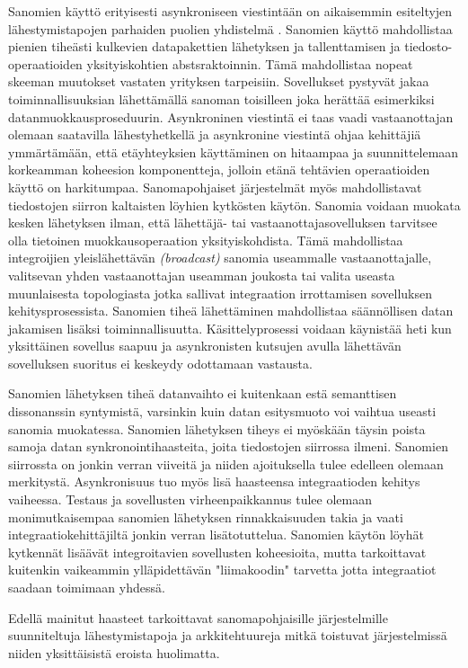 Sanomien käyttö erityisesti asynkroniseen viestintään on aikaisemmin esiteltyjen lähestymistapojen parhaiden puolien yhdistelmä \citep[sivu~73]{Hohpe2004}.
Sanomien käyttö mahdollistaa pienien tiheästi kulkevien datapakettien lähetyksen ja tallenttamisen ja tiedosto-operaatioiden yksityiskohtien abstsraktoinnin. Tämä mahdollistaa nopeat skeeman muutokset vastaten yrityksen tarpeisiin.
Sovellukset pystyvät jakaa toiminnallisuuksian lähettämällä sanoman toisilleen joka herättää esimerkiksi datanmuokkausproseduurin. Asynkroninen viestintä ei taas vaadi vastaanottajan olemaan saatavilla lähestyhetkellä ja asynkronine viestintä ohjaa kehittäjiä ymmärtämään, että etäyhteyksien käyttäminen on hitaampaa ja suunnittelemaan korkeamman koheesion komponentteja, jolloin etänä tehtävien operaatioiden käyttö on harkitumpaa.
Sanomapohjaiset järjestelmät myös mahdollistavat tiedostojen siirron kaltaisten löyhien kytkösten käytön. Sanomia voidaan muokata kesken lähetyksen ilman, että lähettäjä- tai vastaanottajasovelluksen tarvitsee olla tietoinen muokkausoperaation yksityiskohdista. Tämä mahdollistaa integroijien yleislähettävän \textit{(broadcast)} sanomia useammalle vastaanottajalle, valitsevan yhden vastaanottajan useamman joukosta tai valita useasta muunlaisesta topologiasta jotka sallivat integraation irrottamisen sovelluksen kehitysprosessista. 
Sanomien tiheä lähettäminen mahdollistaa säännöllisen datan jakamisen lisäksi toiminnallisuutta. Käsittelyprosessi voidaan käynistää heti kun yksittäinen sovellus saapuu ja asynkronisten kutsujen avulla lähettävän sovelluksen suoritus ei keskeydy odottamaan vastausta.


Sanomien lähetyksen tiheä datanvaihto ei kuitenkaan estä semanttisen dissonanssin syntymistä, varsinkin kuin datan esitysmuoto voi vaihtua useasti sanomia muokatessa.
Sanomien lähetyksen tiheys ei myöskään täysin poista samoja datan synkronointihaasteita, joita tiedostojen siirrossa ilmeni. Sanomien siirrossta on jonkin verran viiveitä ja niiden ajoituksella tulee edelleen olemaan merkitystä.
Asynkronisuus tuo myös lisä haasteensa integraatioden kehitys vaiheessa. Testaus ja sovellusten virheenpaikkannus tulee olemaan monimutkaisempaa sanomien lähetyksen rinnakkaisuuden takia ja vaati integraatiokehittäjiltä jonkin verran lisätotuttelua.
Sanomien käytön löyhät kytkennät lisäävät integroitavien sovellusten koheesioita, mutta tarkoittavat kuitenkin vaikeammin ylläpidettävän "liimakoodin" tarvetta jotta integraatiot saadaan toimimaan yhdessä.

Edellä mainitut haasteet tarkoittavat sanomapohjaisille järjestelmille suunniteltuja lähestymistapoja ja arkkitehtuureja mitkä toistuvat järjestelmissä niiden yksittäisistä eroista huolimatta.

